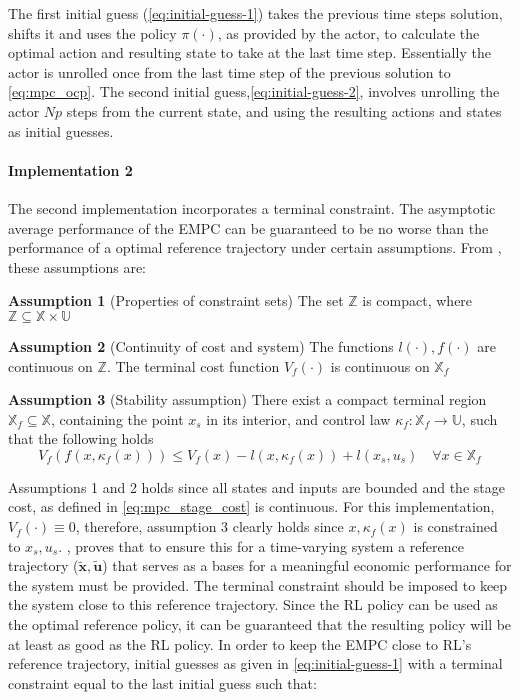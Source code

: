 The first initial guess (\autoref{eq:initial-guess-1}) takes the previous time steps solution, shifts it and uses the policy $\pi(\cdot)$, as provided by the actor, to calculate the optimal action and resulting state to take at the last time step. Essentially the actor is unrolled once from the last time step of the previous solution to \autoref{eq:mpc_ocp}. The second initial guess,\autoref{eq:initial-guess-2}, involves unrolling the actor $Np$ steps from the current state, and using the resulting actions and states as initial guesses. 

\paragraph{Implementation 2}
The second implementation incorporates a terminal constraint. The asymptotic average performance of the EMPC can be guaranteed to be no worse than the performance of a optimal reference trajectory under certain assumptions. From \cite{amritEconomicOptimizationUsing2011}, these assumptions are:

\hspace{1cm} \textbf{Assumption 1} (Properties of constraint sets) The set $\mathbb{Z}$ is compact, where $\mathbb{Z} \subseteq \mathbb{X} \times \mathbb{U}$

\hspace{1cm} \textbf{Assumption 2}  (Continuity of cost and system) The functions $l(\cdot), f(\cdot)$ are continuous on $\mathbb{Z}$. The terminal cost function $V_f(\cdot)$ is continuous on $\mathbb{X}_f$ 

\hspace{1cm} \textbf{Assumption 3} (Stability assumption) There exist a compact terminal region $\mathbb{X}_f \subseteq \mathbb{X}$, containing the point $x_s$ in its interior, and control law $\kappa_f : \mathbb{X}_f \rightarrow \mathbb{U}$, such that the following holds 
\begin{equation}\label{eq:assumption_3}
	V_f(f(x,\kappa_f(x))) \leq V_f(x) - l(x,\kappa_f(x)) + l(x_s,u_s) \quad \forall x \in \mathbb{X}_f
\end{equation}

Assumptions 1 and 2 holds since all states and inputs are bounded and the stage cost, as defined in \autoref{eq:mpc_stage_cost} is continuous. For this implementation, $V_f(\cdot) \equiv 0$, therefore, assumption 3 clearly holds since $x,\kappa_f(x)$ is constrained to $x_s,u_s$.
 \cite{risbeckEconomicModelPredictive2020}, \cite{amritEconomicOptimizationUsing2011} proves that to ensure this for a time-varying system a reference trajectory ($\tilde{\mathbf{x}},\tilde{\mathbf{u}}$) that serves as a bases for a meaningful economic performance for the system must be provided. The terminal constraint should be imposed to keep the system close to this reference trajectory. Since the RL policy can be used as the optimal reference policy, it can be guaranteed that the resulting policy will be at least as good as the RL policy. In order to keep the EMPC close to RL's reference trajectory, initial guesses as given in \autoref{eq:initial-guess-1} with a terminal constraint equal to the last initial guess such that:

